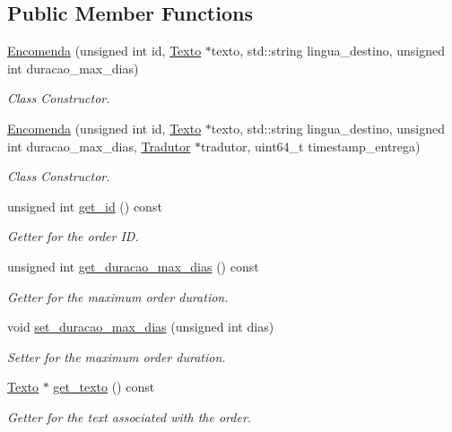 \subsection*{Public Member Functions}
\begin{DoxyCompactItemize}
\item 
\hyperlink{class_encomenda_acd872b2d444252423746ee7529b48ae8}{Encomenda} (unsigned int id, \hyperlink{class_texto}{Texto} $\ast$texto, std\-::string lingua\-\_\-destino, unsigned int duracao\-\_\-max\-\_\-dias)
\begin{DoxyCompactList}\small\item\em Class Constructor. \end{DoxyCompactList}\item 
\hyperlink{class_encomenda_a5009ce207f856836a16e93a6454e93b8}{Encomenda} (unsigned int id, \hyperlink{class_texto}{Texto} $\ast$texto, std\-::string lingua\-\_\-destino, unsigned int duracao\-\_\-max\-\_\-dias, \hyperlink{class_tradutor}{Tradutor} $\ast$tradutor, uint64\-\_\-t timestamp\-\_\-entrega)
\begin{DoxyCompactList}\small\item\em Class Constructor. \end{DoxyCompactList}\item 
unsigned int \hyperlink{class_encomenda_ac63a69c65c4d6971ff43f219c2f4085a}{get\-\_\-id} () const 
\begin{DoxyCompactList}\small\item\em Getter for the order I\-D. \end{DoxyCompactList}\item 
unsigned int \hyperlink{class_encomenda_acc57c2a4dc9fd63c8e3fc8d7009983d2}{get\-\_\-duracao\-\_\-max\-\_\-dias} () const 
\begin{DoxyCompactList}\small\item\em Getter for the maximum order duration. \end{DoxyCompactList}\item 
void \hyperlink{class_encomenda_ab3b5fc8fdde834b5c80f42ff0a2bf88b}{set\-\_\-duracao\-\_\-max\-\_\-dias} (unsigned int dias)
\begin{DoxyCompactList}\small\item\em Setter for the maximum order duration. \end{DoxyCompactList}\item 
\hyperlink{class_texto}{Texto} $\ast$ \hyperlink{class_encomenda_a0a31fd2124968159893d3257b9cadd15}{get\-\_\-texto} () const 
\begin{DoxyCompactList}\small\item\em Getter for the text associated with the order. \end{DoxyCompactList}\item 

\end{DoxyCompactItemize}
